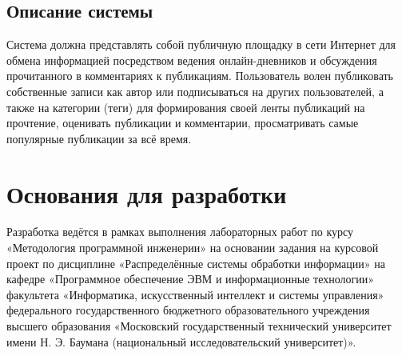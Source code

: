 \documentclass{bmstu-gost-7-32}
\begin{document}
\subsection*{Описание системы}

Система должна представлять собой публичную площадку в сети Интернет для обмена информацией посредством ведения онлайн-дневников и обсуждения прочитанного в комментариях к публикациям.
Пользователь волен публиковать собственные записи как автор или подписываться на других пользователей, а также на категории (теги) для формирования своей ленты публикаций на прочтение, оценивать публикации и комментарии, просматривать самые популярные публикации за всё время.


\section{Основания для разработки}



Разработка ведётся в рамках выполнения лабораторных работ по курсу «Методология программной инженерии» на основании задания на курсовой проект по дисциплине «Распределённые системы обработки информации» на кафедре «Программное обеспечение ЭВМ и информационные технологии» факультета «Информатика, искусственный интеллект и системы управления» федерального государственного бюджетного образовательного учреждения высшего образования «Московский государственный технический университет имени Н. Э. Баумана (национальный исследовательский университет)».
\end{document}
